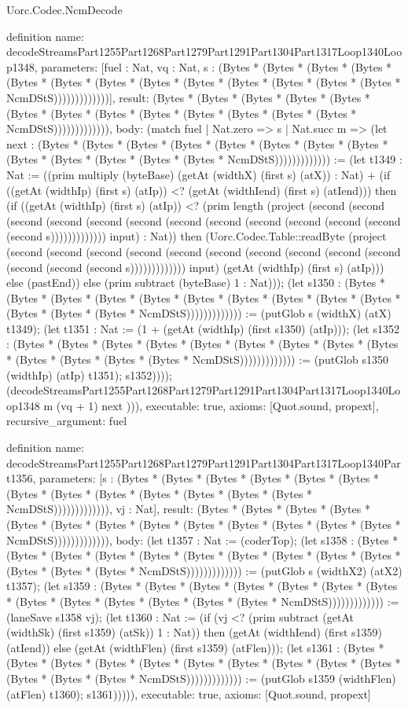 \begin{lexlean}{Uorc.Codec.NcmDecode}
\begin{semanticmodule}
definition{
  name: decodeStreamsPart1255Part1268Part1279Part1291Part1304Part1317Loop1340Loop1348,
  parameters: [fuel : Nat, vq : Nat, s : (Bytes * (Bytes * (Bytes * (Bytes * (Bytes * (Bytes * (Bytes * (Bytes * (Bytes * (Bytes * (Bytes * (Bytes * (Bytes * NcmDStS)))))))))))))],
  result: (Bytes * (Bytes * (Bytes * (Bytes * (Bytes * (Bytes * (Bytes * (Bytes * (Bytes * (Bytes * (Bytes * (Bytes * (Bytes * NcmDStS))))))))))))),
  body: (match fuel
    | Nat.zero => s
    | Nat.succ m => (let next : (Bytes * (Bytes * (Bytes * (Bytes * (Bytes * (Bytes * (Bytes * (Bytes * (Bytes * (Bytes * (Bytes * (Bytes * (Bytes * NcmDStS))))))))))))) := (let t1349 : Nat := ((prim multiply (byteBase) (getAt (widthX) (first s) (atX)) : Nat) + (if ((getAt (widthIp) (first s) (atIp)) <? (getAt (widthIend) (first s) (atIend))) then (if ((getAt (widthIp) (first s) (atIp)) <? (prim length (project (second (second (second (second (second (second (second (second (second (second (second (second (second s))))))))))))) input) : Nat)) then (Uorc.Codec.Table::readByte (project (second (second (second (second (second (second (second (second (second (second (second (second (second s))))))))))))) input) (getAt (widthIp) (first s) (atIp))) else (pastEnd)) else (prim subtract (byteBase) 1 : Nat))); (let s1350 : (Bytes * (Bytes * (Bytes * (Bytes * (Bytes * (Bytes * (Bytes * (Bytes * (Bytes * (Bytes * (Bytes * (Bytes * (Bytes * NcmDStS))))))))))))) := (putGlob s (widthX) (atX) t1349); (let t1351 : Nat := (1 + (getAt (widthIp) (first s1350) (atIp))); (let s1352 : (Bytes * (Bytes * (Bytes * (Bytes * (Bytes * (Bytes * (Bytes * (Bytes * (Bytes * (Bytes * (Bytes * (Bytes * (Bytes * NcmDStS))))))))))))) := (putGlob s1350 (widthIp) (atIp) t1351); s1352)))); (decodeStreamsPart1255Part1268Part1279Part1291Part1304Part1317Loop1340Loop1348 m (vq + 1) next ))),
  executable: true,
  axioms: [Quot.sound, propext],
  recursive_argument: fuel
}

definition{
  name: decodeStreamsPart1255Part1268Part1279Part1291Part1304Part1317Loop1340Part1356,
  parameters: [s : (Bytes * (Bytes * (Bytes * (Bytes * (Bytes * (Bytes * (Bytes * (Bytes * (Bytes * (Bytes * (Bytes * (Bytes * (Bytes * NcmDStS))))))))))))), vj : Nat],
  result: (Bytes * (Bytes * (Bytes * (Bytes * (Bytes * (Bytes * (Bytes * (Bytes * (Bytes * (Bytes * (Bytes * (Bytes * (Bytes * NcmDStS))))))))))))),
  body: (let t1357 : Nat := (coderTop); (let s1358 : (Bytes * (Bytes * (Bytes * (Bytes * (Bytes * (Bytes * (Bytes * (Bytes * (Bytes * (Bytes * (Bytes * (Bytes * (Bytes * NcmDStS))))))))))))) := (putGlob s (widthX2) (atX2) t1357); (let s1359 : (Bytes * (Bytes * (Bytes * (Bytes * (Bytes * (Bytes * (Bytes * (Bytes * (Bytes * (Bytes * (Bytes * (Bytes * (Bytes * NcmDStS))))))))))))) := (laneSave s1358 vj); (let t1360 : Nat := (if (vj <? (prim subtract (getAt (widthSk) (first s1359) (atSk)) 1 : Nat)) then (getAt (widthIend) (first s1359) (atIend)) else (getAt (widthFlen) (first s1359) (atFlen))); (let s1361 : (Bytes * (Bytes * (Bytes * (Bytes * (Bytes * (Bytes * (Bytes * (Bytes * (Bytes * (Bytes * (Bytes * (Bytes * (Bytes * NcmDStS))))))))))))) := (putGlob s1359 (widthFlen) (atFlen) t1360); s1361))))),
  executable: true,
  axioms: [Quot.sound, propext]
}


\end{semanticmodule}
\end{lexlean}
